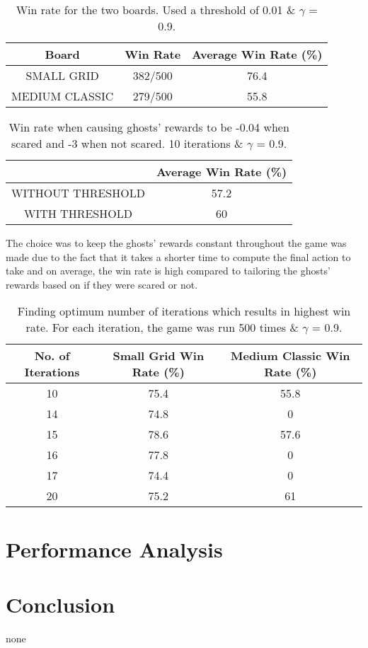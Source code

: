 \documentclass[a4paper]{report}
\begin{document}
        \begin{table}[h!]
          \begin{center}
            \begin{tabular}{c|c|c}
              \textbf{Board} & \textbf{Win Rate} & \textbf{Average Win Rate (\%)} \\
              \hline
              SMALL GRID & 382/500 & 76.4\\
              MEDIUM CLASSIC & 279/500 & 55.8\\
            \end{tabular}
            \caption{Win rate for the two boards. Used a threshold of 0.01 \& $\gamma$ = 0.9.}
            \label{tab:table3}
          \end{center}
        \end{table}

        \begin{table}[h!]
          \begin{center}
            \begin{tabular}{c|c}
              \textbf{} & \textbf{Average Win Rate (\%)} \\
              \hline
              WITHOUT THRESHOLD & 57.2\\
              WITH THRESHOLD & 60\\
            \end{tabular}
            \caption{Win rate when causing ghosts' rewards to be -0.04 when scared and -3 when not scared. 10 iterations \& $\gamma$ = 0.9.}
            \label{tab:table4}
          \end{center}
        \end{table}
The choice was to keep the ghosts' rewards constant throughout the game was made due to the fact that it takes a shorter time to compute the final action to take and on average, the win rate is high compared to tailoring the ghosts' rewards based on if they were scared or not.

        \begin{table}[h!]
          \begin{center}
            \begin{tabular}{c|c|c}
              \textbf{No. of Iterations} & \textbf{Small Grid Win Rate (\%)} & \textbf{Medium Classic Win Rate (\%)}\\
              \hline
              10 & 75.4 & 55.8\\
              14 & 74.8 & 0\\
              15 & 78.6 & 57.6\\
              16 & 77.8 & 0\\
              17 & 74.4 & 0\\
              20 & 75.2 & 61\\
            \end{tabular}
            \caption{Finding optimum number of iterations which results in highest win rate. For each iteration, the game was run 500 times \& $\gamma$ = 0.9.}
            \label{tab:table5}
          \end{center}
        \end{table}
  \section*{Performance Analysis}


  \section*{Conclusion}
  none
\end{document}
